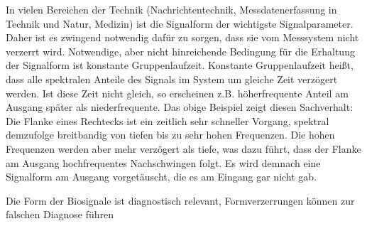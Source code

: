 \documentclass[a4paper]{article}
\begin{document}
\begin{multicols}{3}
  In vielen Bereichen der Technik (Nachrichtentechnik, Messdatenerfassung
  in Technik und Natur, Medizin) ist die Signalform der wichtigste
  Signalparameter. Daher ist es zwingend notwendig dafür zu sorgen, dass
  sie vom Messsystem nicht verzerrt wird. Notwendige, aber nicht
  hinreichende Bedingung für die Erhaltung der Signalform ist konstante
  Gruppenlaufzeit. Konstante Gruppenlaufzeit heißt, dass alle spektralen
  Anteile des Signals im System um gleiche Zeit verzögert werden. Ist
  diese Zeit nicht gleich, so erscheinen z.B. höherfrequente Anteil am
  Ausgang später als niederfrequente. Das obige Beispiel zeigt diesen
  Sachverhalt: Die Flanke eines Rechtecks ist ein zeitlich sehr schneller
  Vorgang, spektral demzufolge breitbandig von tiefen bis zu sehr hohen
  Frequenzen. Die hohen Frequenzen werden aber mehr verzögert als tiefe,
  was dazu führt, dass der Flanke am Ausgang hochfrequentes Nachschwingen
  folgt. Es wird demnach eine Signalform am Ausgang vorgetäuscht, die es
  am Eingang gar nicht gab.

  Die Form der Biosignale ist diagnostisch relevant, Formverzerrungen
  können zur falschen Diagnose führen


\end{multicols}
\end{document}
